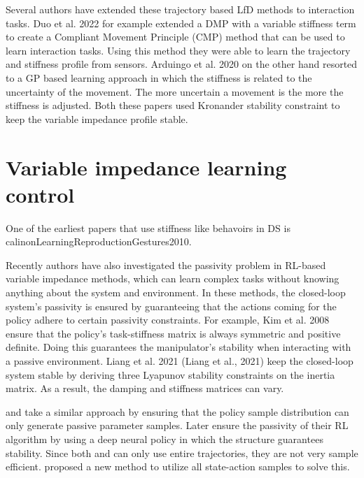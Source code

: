 Several authors have extended these trajectory based LfD methods to interaction tasks. Duo et al. 2022 for example \cite{douRobotSkillLearning2022} extended a DMP with a variable stiffness term to create a Compliant Movement Principle (CMP) method that can be used to learn interaction tasks. Using this method they were able to learn the trajectory and stiffness profile from sensors. Arduingo et al. 2020 on the other hand resorted to a GP based learning approach in which the stiffness is related to the uncertainty of the movement. The more uncertain a movement is the more the stiffness is adjusted. Both these papers used Kronander stability constraint to keep the variable impedance profile stable.


\section{Variable impedance learning control}


One of the earliest papers that use stiffness like behavoirs in DS is calinonLearningReproductionGestures2010.


Recently authors have also investigated the passivity problem in RL-based variable impedance methods, which can learn complex tasks without knowing anything about the system and environment. In these methods, the closed-loop system's passivity is ensured by guaranteeing that the actions coming for the policy adhere to certain passivity constraints. For example, Kim et al. 2008 \cite{kimLearningRobotStiffness2008} ensure that the policy's task-stiffness matrix is always symmetric and positive definite. Doing this guarantees the manipulator's stability when interacting with a passive environment. Liang et al. 2021 (Liang et al., 2021) keep the closed-loop system stable by deriving three Lyapunov stability constraints on the inertia matrix. As a result, the damping and stiffness matrices can vary.

\cite{reyLearningMotionsDemonstrations2018} and \cite{khaderStabilityGuaranteedReinforcementLearning2020} take a similar approach by ensuring that the policy sample distribution can only generate passive parameter samples. Later \cite{khaderLearningDeepEnergy2021} ensure the passivity of their RL algorithm by using a deep neural policy in which the structure guarantees stability. Since both \cite{khaderStabilityGuaranteedReinforcementLearning2020,reyLearningMotionsDemonstrations2018} and \cite{khaderLearningDeepEnergy2021}can only use entire trajectories, they are not very sample efficient. \cite{khaderLearningStableNormalizingFlow2021} proposed a new method to utilize all state-action samples to solve this.

